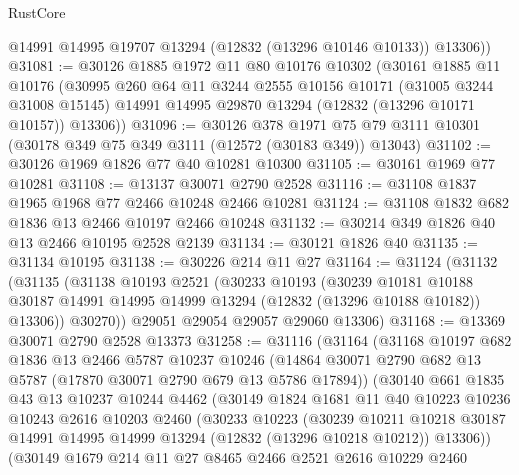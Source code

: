 \begin{lexlean}{RustCore}
\begin{coremodule}
        @14991
        @14995
        @19707
        @13294
        (@12832 (@13296 @10146 @10133))
        @13306))
@31081 := @30126
    @1885
    @1972
    @11
    @80
    @10176
    @10302
    (@30161
      @1885
      @11
      @10176
      (@30995
        @260
        @64
        @11
        @3244
        @2555
        @10156
        @10171
        (@31005 @3244 @31008 @15145)
        @14991
        @14995
        @29870
        @13294
        (@12832 (@13296 @10171 @10157))
        @13306))
@31096 := @30126
    @378
    @1971
    @75
    @79
    @3111
    @10301
    (@30178 @349 @75 @349 @3111 (@12572 (@30183 @349)) @13043)
@31102 := @30126 @1969 @1826 @77 @40 @10281 @10300
@31105 := @30161 @1969 @77 @10281
@31108 := @13137 @30071 @2790 @2528
@31116 := @31108 @1837 @1965 @1968 @77 @2466 @10248 @2466 @10281
@31124 := @31108 @1832 @682 @1836 @13 @2466 @10197 @2466 @10248
@31132 := @30214 @349 @1826 @40 @13 @2466 @10195 @2528 @2139
@31134 := @30121 @1826 @40
@31135 := @31134 @10195
@31138 := @30226 @214 @11 @27
@31164 := @31124
    (@31132
      (@31135
        (@31138
          @10193
          @2521
          (@30233
            @10193
            (@30239
              @10181
              @10188
              @30187
              @14991
              @14995
              @14999
              @13294
              (@12832 (@13296 @10188 @10182))
              @13306))
          @30270))
      @29051
      @29054
      @29057
      @29060
      @13306)
@31168 := @13369 @30071 @2790 @2528 @13373
@31258 := @31116
    (@31164
      (@31168
        @10197
        @682
        @1836
        @13
        @2466
        @5787
        @10237
        @10246
        (@14864 @30071 @2790 @682 @13 @5787 (@17870 @30071 @2790 @679 @13 @5786 @17894))
        (@30140
          @661
          @1835
          @43
          @13
          @10237
          @10244
          @4462
          (@30149
            @1824
            @1681
            @11
            @40
            @10223
            @10236
            @10243
            @2616
            @10203
            @2460
            (@30233
              @10223
              (@30239
                @10211
                @10218
                @30187
                @14991
                @14995
                @14999
                @13294
                (@12832 (@13296 @10218 @10212))
                @13306))
            (@30149
              @1679
              @214
              @11
              @27
              @8465
              @2466
              @2521
              @2616
              @10229
              @2460

\end{coremodule}
\end{lexlean}
